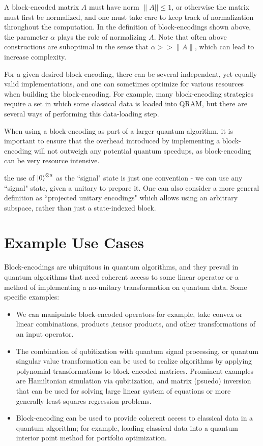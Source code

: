 \documentclass[12pt, oneside]{book}
\theoremstyle{definition}
\theoremstyle{definition}
\theoremstyle{remark}
\begin{document}
\begin{importantnote}
    A block-encoded matrix $A$ must have norm $\|A||\leq 1$, or otherwise the matrix must first be normalized, and one must take care to keep track of normalization throughout the computation. In the definition of block-encodings shown above, the parameter $\alpha$ plays the role of normalizing $A$. Note that often above constructions are suboptimal in the sense that $\alpha>>\|A\|$, which can lead to increase complexity.

    For a given desired block encoding, there can be several independent, yet equally valid implementations, and one can sometimes optimize for various resources when building the block-encoding. For example, many block-encoding strategies require a set in which some classical data is loaded into QRAM, but there are several ways of performing this data-loading step.

    When using a block-encoding as part of a larger quantum algorithm, it is important to ensure that the overhead introduced by implementing a block-encoding will not outweigh any potential quantum speedups, as block-encoding can be very resource intensive.

    the use of $\ket{0}^{\otimes a}$ as the ``signal" state is just one convention - we can use any ``signal" state, given a unitary to prepare it. One can also consider a more general definition as ``projected unitary encodings" which allows using an arbitrary subspace, rather than just a state-indexed block.
\end{importantnote}

\section{Example Use Cases}
Block-encodings are ubiquitous in quantum algorithms, and they prevail in quantum algorithms that need coherent access to some linear operator or a method of implementing a no-unitary transformation on quantum data. Some specific examples:
\begin{itemize}
    \item We can manipulate block-encoded operators-for example, take convex or linear combinations, products ,tensor products, and other transformations of an input operator.
    \item The combination of qubitization with quantum signal processing, or quantum singular value transformation can be used to realize algorithms by applying polynomial transformations to block-encoded matrices. Prominent examples are Hamiltonian simulation via qubitization, and matrix (psuedo) inversion that can be used for solving large linear system of equations or more generally least-squares regression problems.
    \item Block-encoding can be used to provide coherent access to classical data in a quantum algorithm; for example, loading classical data into a quantum interior point method for portfolio optimization.
\end{itemize}
\end{document}
